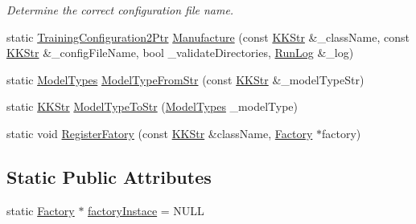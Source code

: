 \begin{DoxyCompactItemize}
\begin{DoxyCompactList}\small\item\em Determine the correct configuration file name. \end{DoxyCompactList}\item 
static \hyperlink{class_k_k_m_l_l_1_1_training_configuration2_a16dd529d03718630f6f58f572e9535f8}{Training\+Configuration2\+Ptr} \hyperlink{class_k_k_m_l_l_1_1_training_configuration2_aeedf4fa6f859b081f2657720ebc90b9f}{Manufacture} (const \hyperlink{class_k_k_b_1_1_k_k_str}{K\+K\+Str} \&\+\_\+class\+Name, const \hyperlink{class_k_k_b_1_1_k_k_str}{K\+K\+Str} \&\+\_\+config\+File\+Name, bool \+\_\+validate\+Directories, \hyperlink{class_k_k_b_1_1_run_log}{Run\+Log} \&\+\_\+log)
\item 
static \hyperlink{class_k_k_m_l_l_1_1_model_aeda4060e088c67446ca993eefcecea06}{Model\+Types} \hyperlink{class_k_k_m_l_l_1_1_training_configuration2_a5bcf9ec536ed144943839b2bb5014190}{Model\+Type\+From\+Str} (const \hyperlink{class_k_k_b_1_1_k_k_str}{K\+K\+Str} \&\+\_\+model\+Type\+Str)
\item 
static \hyperlink{class_k_k_b_1_1_k_k_str}{K\+K\+Str} \hyperlink{class_k_k_m_l_l_1_1_training_configuration2_abe289f8fc24348e4cf7edbd32f871dcd}{Model\+Type\+To\+Str} (\hyperlink{class_k_k_m_l_l_1_1_model_aeda4060e088c67446ca993eefcecea06}{Model\+Types} \+\_\+model\+Type)
\item 
static void \hyperlink{class_k_k_m_l_l_1_1_training_configuration2_a666a8a9603132f251506205d60b9a7b5}{Register\+Fatory} (const \hyperlink{class_k_k_b_1_1_k_k_str}{K\+K\+Str} \&class\+Name, \hyperlink{class_k_k_m_l_l_1_1_training_configuration2_1_1_factory}{Factory} $\ast$factory)
\end{DoxyCompactItemize}
\subsection*{Static Public Attributes}
\begin{DoxyCompactItemize}
\item 
static \hyperlink{class_k_k_m_l_l_1_1_training_configuration2_1_1_factory}{Factory} $\ast$ \hyperlink{class_k_k_m_l_l_1_1_training_configuration2_a864a70941c2e667264c3274340ce2862}{factory\+Instace} = N\+U\+LL
\end{DoxyCompactItemize}

